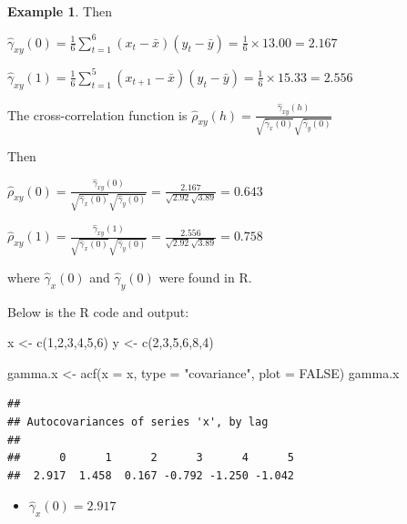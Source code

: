 \documentclass[
]{book}
\newenvironment{Shaded}{\begin{snugshade}}{\end{snugshade}}
\newcommand{\AttributeTok}[1]{\textcolor[rgb]{0.77,0.63,0.00}{#1}}
\newcommand{\ConstantTok}[1]{\textcolor[rgb]{0.00,0.00,0.00}{#1}}
\newcommand{\DecValTok}[1]{\textcolor[rgb]{0.00,0.00,0.81}{#1}}
\newcommand{\FunctionTok}[1]{\textcolor[rgb]{0.00,0.00,0.00}{#1}}
\newcommand{\NormalTok}[1]{#1}
\newcommand{\OtherTok}[1]{\textcolor[rgb]{0.56,0.35,0.01}{#1}}
\newcommand{\StringTok}[1]{\textcolor[rgb]{0.31,0.60,0.02}{#1}}
\providecommand{\tightlist}{%
  \setlength{\itemsep}{0pt}\setlength{\parskip}{0pt}}
\theoremstyle{definition}
\theoremstyle{definition}
\newtheorem{example}{Example}[chapter]
\theoremstyle{definition}
\theoremstyle{definition}
\theoremstyle{remark}
\begin{document}
\begin{example}
Then

\(\hat \gamma_{xy}(0)=\frac16\sum_{t=1}^{6}(x_t-\bar x)(y_t-\bar y)=\frac16\times 13.00=2.167\)

\(\hat \gamma_{xy}(1)=\frac16\sum_{t=1}^{5}(x_{t+1}-\bar x)(y_t-\bar y)=\frac16\times 15.33=2.556\)

The cross-correlation function is \(\hat \rho_{xy}(h)=\frac{\hat \gamma_{xy}(h)}{\sqrt{\hat \gamma_x(0)}\sqrt{\hat \gamma_y(0)}}\)

Then

\(\hat \rho_{xy}(0)=\frac{\hat \gamma_{xy}(0)}{\sqrt{\hat \gamma_x(0)}\sqrt{\hat \gamma_y(0)}}=\frac{2.167}{\sqrt{2.92}\sqrt{3.89}}=0.643\)

\(\hat \rho_{xy}(1)=\frac{\hat \gamma_{xy}(1)}{\sqrt{\hat \gamma_x(0)}\sqrt{\hat \gamma_y(0)}}=\frac{2.556}{\sqrt{2.92}\sqrt{3.89}}=0.758\)

where \(\hat \gamma_x(0)\) and \(\hat \gamma_y(0)\) were found in R.

Below is the R code and output:

\begin{Shaded}
\begin{Highlighting}[]
\NormalTok{x }\OtherTok{\textless{}{-}} \FunctionTok{c}\NormalTok{(}\DecValTok{1}\NormalTok{,}\DecValTok{2}\NormalTok{,}\DecValTok{3}\NormalTok{,}\DecValTok{4}\NormalTok{,}\DecValTok{5}\NormalTok{,}\DecValTok{6}\NormalTok{)}
\NormalTok{y }\OtherTok{\textless{}{-}} \FunctionTok{c}\NormalTok{(}\DecValTok{2}\NormalTok{,}\DecValTok{3}\NormalTok{,}\DecValTok{5}\NormalTok{,}\DecValTok{6}\NormalTok{,}\DecValTok{8}\NormalTok{,}\DecValTok{4}\NormalTok{)}

\NormalTok{gamma.x }\OtherTok{\textless{}{-}} \FunctionTok{acf}\NormalTok{(}\AttributeTok{x =}\NormalTok{ x, }\AttributeTok{type =} \StringTok{"covariance"}\NormalTok{, }\AttributeTok{plot =} \ConstantTok{FALSE}\NormalTok{)}
\NormalTok{gamma.x}
\end{Highlighting}
\end{Shaded}

\begin{verbatim}
## 
## Autocovariances of series 'x', by lag
## 
##      0      1      2      3      4      5 
##  2.917  1.458  0.167 -0.792 -1.250 -1.042
\end{verbatim}

\begin{itemize}
\tightlist
\item
  \(\hat \gamma_x(0)=2.917\)
\end{itemize}


\end{example}
\end{document}

